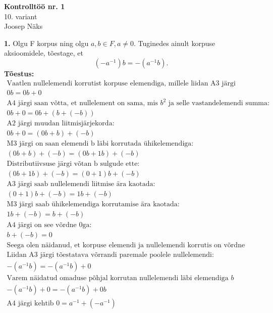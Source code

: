 \documentclass{article}
\begin{document}
\begin{center}
\Large\textbf{Kontrollt\"o\"o nr. 1}\\
10. variant\\
\small{Joosep N\"aks}
\end{center}
\textbf{1.} Olgu F korpus ning olgu $a,b\in F,a\neq 0$. Tuginedes ainult korpuse aksioomidele, t\~oestage, et
\begin{equation*}
(-a^{-1})b=-(a^{-1}b).
\end{equation*}
\textbf{T\~oestus:}
\begin{equation*}
\begin{aligned}
\text{Vaatlen nullelemendi korrutist korpuse elemendiga, millele liidan A3 j\"argi nullelemendi:}\\
0b=0b+0\\
\text{A4 j\"argi saan v\~otta, et nullelement on sama, mis }b^2\text{ ja selle vastandelemendi summa:}\\
0b+0=0b+(b+(-b))\\
\text{A2 j\"argi muudan liitmisj\"arjekorda:}\\
0b+0=(0b+b)+(-b)\\
\text{M3 j\"argi on saan elemendi b l\"abi korrutada \"uhikelemendiga:}\\
(0b+b)+(-b)=(0b+1b)+(-b)\\
\text{Distributiivsuse j\"argi v\~otan b sulgude ette:}\\
(0b+1b)+(-b)=(0+1)b+(-b)\\
\text{A3 j\"argi saab nullelemendi liitmise \"ara kaotada:}\\
(0+1)b+(-b)=1b+(-b)\\
\text{M3 j\"argi saab \"uhikelemendiga korrutamise \"ara kaotada:}\\
1b+(-b)=b+(-b)\\
\text{A4 j\"argi on see v\~ordne 0ga:}\\
b+(-b)=0\\
\text{Seega olen n\"aidanud, et korpuse elemendi ja nullelemendi korrutis on v\~ordne nullelemendiga.}\\
\text{Liidan A3 j\"argi t\~oestatava v\~orrandi paremale poolele nullelemendi:}\\
-(a^{-1}b)=-(a^{-1}b)+0\\
\text{Varem n\"aidatud omaduse p\~ohjal korrutan nullelemendi l\"abi elemendiga }b\\
-(a^{-1}b)+0=-(a^{-1}b)+0b\\
\text{A4 j\"argi kehtib }0=a^{-1}+(-a^{-1})\\

\end{aligned}
\end{equation*}
\end{document}

